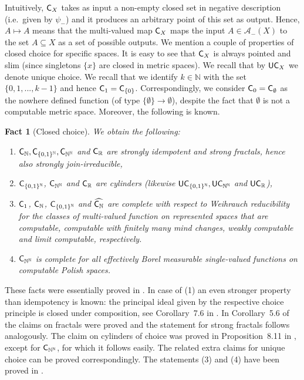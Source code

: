 \documentclass[a4paper]{amsart}
\def\AA{{\mathcal A}}
\def\IN{{\mathbb{N}}}
\def\IR{{\mathbb{R}}}
\def\In{\subseteq}
\def\Cantor{{\{0,1\}^\IN}}
\def\Baire{{\IN^\IN}}
\def\C{\mbox{\rm\sffamily C}}
\def\UC{\mbox{\rm\sffamily UC}}
\newtheorem{fact}[theorem]{Fact}
\theoremstyle{definition}
\begin{document}
Intuitively, $\C_X$ takes as input a non-empty closed set in negative description (i.e.\ given by $\psi_-$) 
and it produces an arbitrary point of this set as output.
Hence, $A\mapsto A$ means that the multi-valued map $\C_X$ maps
the input $A\in\AA_-(X)$ to the set $A\In X$ as a set of possible outputs.
We mention a couple of properties of closed choice for specific spaces.
It is easy to see that $\C_X$ is always pointed and slim (since singletons $\{x\}$ are closed in metric spaces).
We recall that by $\UC_X$ we denote unique choice.
We recall that we identify $k\in\IN$ with the set $\{0,1,...,k-1\}$ and hence $\C_1=\C_{\{0\}}$.
Correspondingly, we consider $\C_0=\C_\emptyset$ as the nowhere defined function (of type $\{\emptyset\}\to\emptyset$),
despite the fact that $\emptyset$ is not a computable metric space.
Moreover, the following is known.

\begin{fact}[Closed choice]
\label{fact:closed-choice}
We obtain the following:
\begin{enumerate}
\item $\C_\IN,\C_\Cantor,\C_\Baire$ and $\C_\IR$ are strongly idempotent and strong fractals, hence also strongly join-irreducible,
\item $\C_\Cantor$, $\C_\Baire$ and $\C_\IR$ are cylinders (likewise $\UC_\Cantor,\UC_\Baire$ and $\UC_\IR$),
\item $\C_1$, $\C_\IN$, $\C_\Cantor$ and $\widehat{\C_\IN}$ are complete
        with respect to Weihrauch reducibility for the classes of multi-valued function on represented spaces
        that are computable, computable with finitely many mind changes, weakly computable and limit computable, respectively. 
\item $\C_\Baire$ is complete for all effectively Borel measurable single-valued functions on 
         computable Polish spaces. 
\end{enumerate}
\end{fact}

These facts were essentially proved in \cite{BG11,BG11a,BBP}. 
In case of (1) an even stronger property than idempotency is known: the principal ideal given by 
the respective choice principle is closed under composition, see Corollary~7.6 in \cite{BBP}.
In Corollary~5.6 of \cite{BBP} the claims on fractals were proved and the statement for strong fractals follows analogously.
The claim on cylinders of choice was proved in Proposition~8.11 in \cite{BBP}, except for $\C_\Baire$, for which it follows easily.
The related extra claims for unique choice can be proved correspondingly.
The statements (3) and (4) have been proved in \cite{BBP}.
\end{document}
